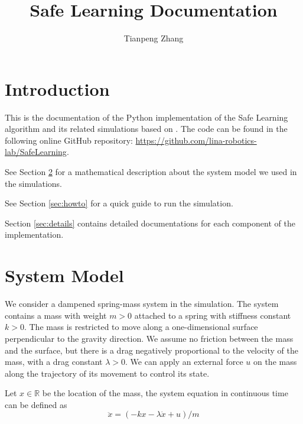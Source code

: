 \documentclass{article}
\theoremstyle{definition}
\theoremstyle{remark}
\begin{document}
	\title{\LARGE \bf Safe Learning Documentation}
	\author{Tianpeng Zhang}
	\maketitle
	
	\section{Introduction}
	This is the documentation of the Python implementation of the Safe Learning algorithm and its related simulations based on \cite{li2021safe}. The code can be found in the following online GitHub repository: \url{https://github.com/lina-robotics-lab/SafeLearning}. 
	
	See Section \ref{sec:system} for a mathematical description about the system model we used in the simulations.
	
	See Section \ref{sec:howto} for a quick guide to run the simulation.
	
	Section \ref{sec:details} contains detailed documentations for each component of the implementation.
	
	\section{System Model}\label{sec:system}
	We consider a dampened spring-mass system in the simulation. The system contains a mass with weight $m>0$ attached to a spring with stiffness constant $k>0$. The mass is restricted to move along a one-dimensional surface perpendicular to the gravity direction. We assume no friction between the mass and the surface, but there is a drag negatively proportional to the velocity of the mass, with a drag constant $\lambda>0$. We can apply an external force
	$u$ on the mass along the trajectory of its movement to control its state.
	
	Let $x\in \mathbb{R}$ be the location of the mass, the system equation in continuous time can be defined as 
	\begin{equation}\label{eq:contModel}
		\ddot{x} = (-k x - \lambda \dot{x} + u)/m
	\end{equation}
\end{document}
